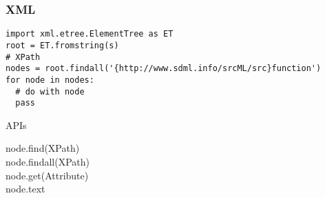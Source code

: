 \subsubsection{XML}
\begin{lstlisting}
import xml.etree.ElementTree as ET
root = ET.fromstring(s)
# XPath
nodes = root.findall('{http://www.sdml.info/srcML/src}function')
for node in nodes:
  # do with node
  pass
\end{lstlisting}

APIs
\begin{description}
\item [node.find(XPath)]
\item [node.findall(XPath)]
\item [node.get(Attribute)]
\item [node.text]
\end{description}





